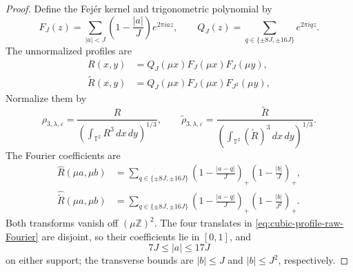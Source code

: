 \documentclass[12pt,reqno,letterpaper]{amsart}
\numberwithin{equation}{section}
\theoremstyle{definition}
\newcommand{\T}{\mathbb T}
\newcommand{\Z}{\mathbb Z}
\newcommand{\eps}{\varepsilon}
\newcommand{\la}{\lambda}
\newcommand{\abs}[1]{\left\lvert #1\right\rvert}
\begin{document}
\begin{proof}
Define the Fej\'er kernel and trigonometric polynomial by
\[
 F_J(z)=\sum_{\abs a<J}\left(1-\frac{\abs a}{J}\right)e^{2\pi iaz},
 \qquad
 Q_J(z)=\sum_{q\in\{\pm8J,\pm16J\}}e^{2\pi iqz}.
\]
The unnormalized profiles are
\begin{equation*}
 \begin{aligned}
 R(x,y)
 &=Q_J(\mu x)F_J(\mu x)F_J(\mu y),\\
 \widetilde R(x,y)
 &=Q_J(\mu x)F_J(\mu x)F_{J^2}(\mu y),
 \end{aligned}
\end{equation*}
Normalize them by
\[
 \rho_{3,\la,\eps}
 =\frac{R}
 {\left(\int_{\T^2}R^3\,dx\,dy\right)^{1/3}},
 \qquad
 \widetilde{\rho}_{3,\la,\eps}
 =\frac{\widetilde R}
 {\left(\int_{\T^2}(\widetilde R)^3\,dx\,dy\right)^{1/3}}.
\]
The Fourier coefficients are
\begin{equation}\label{eq:cubic-profile-raw-Fourier}
 \begin{aligned}
 \widehat R(\mu a,\mu b)
 &=\sum_{q\in\{\pm8J,\pm16J\}}
 \left(1-\frac{\abs{a-q}}J\right)_+
 \left(1-\frac{\abs b}J\right)_+,\\
 \widehat{\widetilde R}(\mu a,\mu b)
 &=\sum_{q\in\{\pm8J,\pm16J\}}
 \left(1-\frac{\abs{a-q}}J\right)_+
 \left(1-\frac{\abs b}{J^2}\right)_+.
 \end{aligned}
\end{equation}
Both transforms vanish off $(\mu\Z)^2$.  The four translates in
\eqref{eq:cubic-profile-raw-Fourier} are disjoint, so their coefficients
lie in $[0,1]$, and
\[
 7J\leq\abs a\leq17J
\]
on either support; the transverse bounds are $\abs b\leq J$ and
$\abs b\leq J^2$, respectively.


\end{proof}
\end{document}
